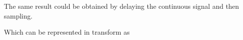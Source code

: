 The same result could be obtained by delaying the continuous
    signal and then sampling.
  \begin{center}
  \end{center}
Which can be represented in transform as
  \begin{center}
  \end{center}
\endinput
